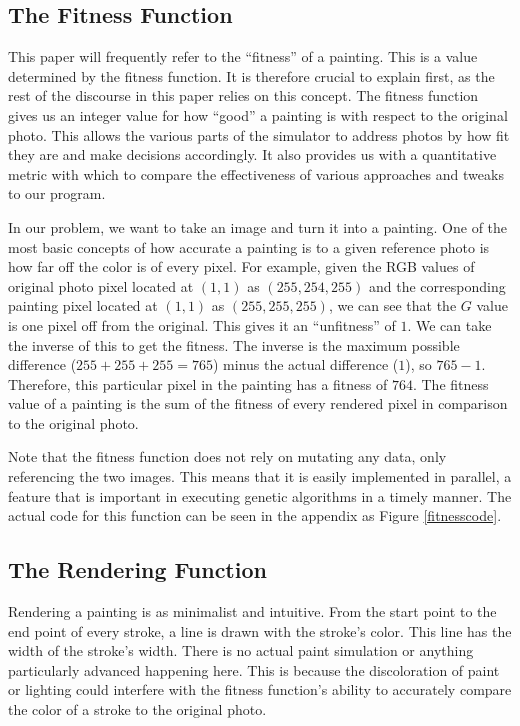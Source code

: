 \subsection{The Fitness Function}
This paper will frequently refer to the ``fitness'' of a painting. This is a value determined by the fitness function. It is therefore crucial to explain first, as the rest of the discourse in this paper relies on this concept. The fitness function gives us an integer value for how ``good'' a painting is with respect to the original photo. This allows the various parts of the simulator to address photos by how fit they are and make decisions accordingly. It also provides us with a quantitative metric with which to compare the effectiveness of various approaches and tweaks to our program.

In our problem, we want to take an image and turn it into a painting. One of the most basic concepts of how accurate a painting is to a given reference photo is how far off the color is of every pixel. For example, given the RGB values of original photo pixel located at $(1, 1)$ as $(255, 254, 255)$ and the corresponding painting pixel located at $(1, 1)$ as $(255, 255, 255)$, we can see that the $G$ value is one pixel off from the original. This gives it an ``unfitness'' of $1$. We can take the inverse of this to get the fitness. The inverse is the maximum possible difference ($255 + 255 + 255 = 765$) minus the actual difference ($1$), so $765 - 1$. Therefore, this particular pixel in the painting has a fitness of $764$. The fitness value of a painting is the sum of the fitness of every rendered pixel in comparison to the original photo.

Note that the fitness function does not rely on mutating any data, only referencing the two images. This means that it is easily implemented in parallel, a feature that is important in executing genetic algorithms in a timely manner. The actual code for this function can be seen in the appendix as Figure \ref{fitnesscode}. 



\subsection{The Rendering Function}

Rendering a painting is as minimalist and intuitive. From the start point to the end point of every stroke, a line is drawn with the stroke's color. This line has the width of the stroke's width. There is no actual paint simulation or anything particularly advanced happening here. This is because the discoloration of paint or lighting could interfere with the fitness function's ability to accurately compare the color of a stroke to the original photo. 

